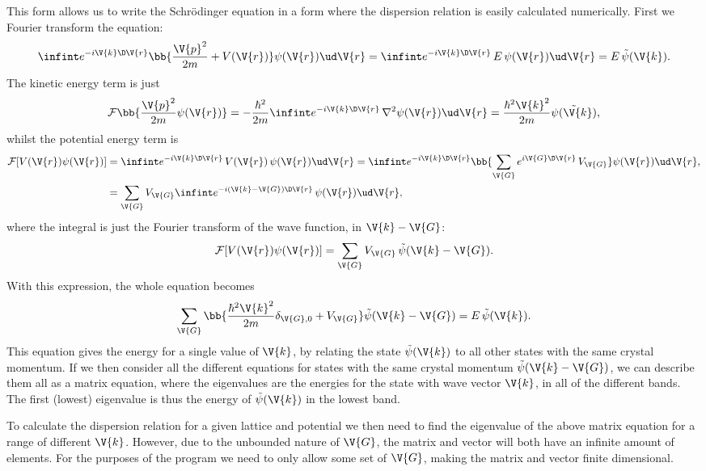 \documentclass[main.tex]{subfiles}
\begin{document}
	This form allows us to write the Schrödinger equation in a form where the dispersion relation is easily calculated numerically. First we Fourier transform the equation:
	\begin{equation}
		\infint e^{-i \V{k} \D \V{r}} \bb{\frac{\V{p}^2}{2m} + V(\V{r})}\psi(\V{r}) \ud \V{r}= \infint e^{-i\V{k} \D \V{r}}\, E\, \psi(\V{r}) \ud \V{r} = E \,\tilde{\psi}(\V{k}).
	\end{equation}
	The kinetic energy term is just
	\begin{equation}
		\mathcal{F}\bb{\frac{\V{p}^2}{2m} \psi(\V{r})} = -\frac{\hbar^2}{2m}\infint e^{-i \V{k} \D \V{r}}\, \nabla^2\psi(\V{r}) \ud \V{r} = \frac{\hbar^2 \V{k}^2}{2m}\tilde{\psi(\V{k})},
	\end{equation}
	whilst the potential energy term is
	\begin{align}
		\mathcal{F}[V(\V{r}) \psi(\V{r})] &= \infint e^{-i \V{k} \D \V{r}}\, V(\V{r})\, \psi(\V{r}) \ud \V{r} = \infint e^{-i \V{k}\D \V{r}} \bb{\sum_{\V{G}} e^{i \V{G} \D \V{r}}\, V_{\V{G}} }\psi (\V{r}) \ud \V{r}, \\
		&= \sum_{\V{G}} V_{\V{G}} \infint e^{-i(\V{k}-\V{G})\D \V{r}}\, \psi(\V{r}) \ud \V{r},
	\end{align}
	where the integral is just the Fourier transform of the wave function, in $ \V{k}-\V{G} $:
	\begin{equation}
		\mathcal{F}[V(\V{r}) \psi(\V{r})] = \sum_{\V{G}} V_{\V{G}} \, \tilde{\psi}(\V{k}-\V{G}).
	\end{equation}
	With this expression, the whole equation becomes
	\begin{equation}
		\sum_{\V{G}} \bb{\frac{\hbar^2 \V{k}^2}{2m} \delta_{\V{G},0} + V_{\V{G}} } \tilde{\psi}(\V{k}-\V{G}) = E\, \tilde{\psi}(\V{k}).
	\end{equation}
	This equation gives the energy for a single value of $ \V{k} $, by relating the state $ \tilde{\psi}(\V{k}) $ to all other states with the same crystal momentum. If we then consider all the different equations for states with the same crystal momentum $ \tilde{\psi} (\V{k}-\V{G}) $, we can describe them all as a matrix equation, where the eigenvalues are the energies for the state with wave vector $ \V{k} $, in all of the different bands. The first (lowest) eigenvalue is thus the energy of $ \tilde{\psi} (\V{k}) $ in the lowest band.
	
	To calculate the dispersion relation for a given lattice and potential we then need to find the eigenvalue of the above matrix equation for a range of different $ \V{k} $. However, due to the unbounded nature of $ \V{G} $, the matrix and vector will both have an infinite amount of elements. For the purposes of the program we need to only allow some set of $ \V{G} $, making the matrix and vector finite dimensional.
	
\end{document}
